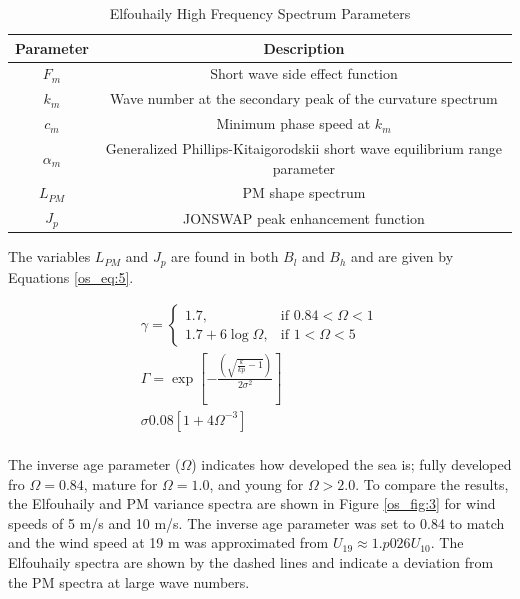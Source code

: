 \begin{table}[H]
\begin{center}
\begin{tabular} {|c | c |}
  Parameter & Description \\ \hline
  $F_m$ & Short wave side effect function \\ \hline
  $k_m$ &  Wave number at the secondary peak of the curvature spectrum \\ \hline
  $c_m$ &  Minimum phase speed at $k_m$ \\ \hline
  $\alpha_m$ & Generalized Phillips-Kitaigorodskii short wave equilibrium range parameter \\ \hline
  $L_{PM}$ & PM shape spectrum \\ \hline
  $J_p$ & JONSWAP peak enhancement function \\ \hline
\end{tabular}
  \renewcommand{\baselinestretch}{1} \small\normalsize
  \begin{quote}
    \caption[Elfouhaily High Frequency Spectrum Parameters]{Elfouhaily High Frequency Spectrum Parameters\label{os_tab:2}}
  \end{quote}
\end{center}
\end{table}
\renewcommand{\baselinestretch}{2} \small\normalsize

The variables $L_{PM}$ and $J_p$ are found in both $B_l$ and $B_h$ and are given by Equations \ref{os_eq:5}.

\begin{equation}
\begin{gathered}
  \label{os_eq:5}
    \gamma = \begin{cases}
    1.7,& \text{if } 0.84 < \Omega < 1\\
    1.7 + 6\log{\Omega}, & \text{if } 1 < \Omega < 5
  \end{cases} \\
  \Gamma = \exp{\left[- \frac{\left(\sqrt{\frac{k}{kp} - 1} \right)}{2\sigma^2} \right]} \\
  \sigma 0.08\left[1 + 4\Omega^{-3} \right] \\
\end{gathered}
\end{equation}
\renewcommand{\baselinestretch}{2} \small\normalsize

The inverse age parameter ($\Omega$) indicates how developed the sea is; fully developed fro $\Omega = 0.84$, mature for $\Omega = 1.0$, and young for $\Omega > 2.0$. To compare the results, the Elfouhaily and PM variance spectra are shown in Figure \ref{os_fig:3} for wind speeds of 5 m/s and 10 m/s. The inverse age parameter was set to 0.84 to match and the wind speed at 19 m was approximated from $U_{19} \approx 1.p026 U_{10}$. The Elfouhaily spectra are shown by the dashed lines and indicate a deviation from the PM spectra at large wave numbers.


